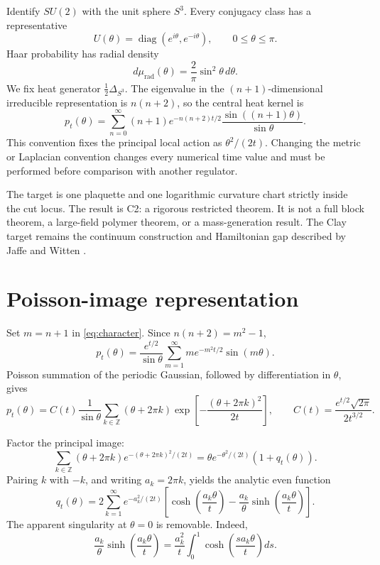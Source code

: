 \documentclass[11pt]{article}
\theoremstyle{definition}
\begin{document}
Identify $SU(2)$ with the unit sphere $S^3$.  Every conjugacy class has a
representative
\[
 U(\theta)=\operatorname{diag}(e^{i\theta},e^{-i\theta}),
 \qquad 0\le\theta\le\pi.
\]
Haar probability has radial density
\begin{equation}\label{eq:haar}
 d\mu_{\mathrm{rad}}(\theta)=\frac{2}{\pi}\sin^2\theta\,d\theta.
\end{equation}
We fix heat generator $\frac12\Delta_{S^3}$.  The eigenvalue in the
$(n+1)$-dimensional irreducible representation is $n(n+2)$, so the central
heat kernel is
\begin{equation}\label{eq:character}
 p_t(\theta)=\sum_{n=0}^{\infty}(n+1)e^{-n(n+2)t/2}
 \frac{\sin((n+1)\theta)}{\sin\theta}.
\end{equation}
This convention fixes the principal local action as $\theta^2/(2t)$.  Changing
the metric or Laplacian convention changes every numerical time value and must
be performed before comparison with another regulator.

The target is one plaquette and one logarithmic curvature chart strictly
inside the cut locus.  The result is C2: a rigorous restricted theorem.  It is
not a full block theorem, a large-field polymer theorem, or a mass-generation
result.  The Clay target remains the continuum construction and Hamiltonian
gap described by Jaffe and Witten \cite{JaffeWitten}.

\section{Poisson-image representation}

Set $m=n+1$ in \eqref{eq:character}.  Since $n(n+2)=m^2-1$,
\[
 p_t(\theta)=\frac{e^{t/2}}{\sin\theta}
 \sum_{m=1}^{\infty}m e^{-m^2t/2}\sin(m\theta).
\]
Poisson summation of the periodic Gaussian, followed by differentiation in
$\theta$, gives
\begin{equation}\label{eq:image}
 p_t(\theta)=C(t)\frac{1}{\sin\theta}
 \sum_{k\in\mathbb Z}(\theta+2\pi k)
 \exp\left[-\frac{(\theta+2\pi k)^2}{2t}\right],
 \qquad
 C(t)=\frac{e^{t/2}\sqrt{2\pi}}{2t^{3/2}}.
\end{equation}

Factor the principal image:
\begin{equation}\label{eq:q-def}
 \sum_{k\in\mathbb Z}(\theta+2\pi k)e^{-(\theta+2\pi k)^2/(2t)}
 =\theta e^{-\theta^2/(2t)}(1+q_t(\theta)).
\end{equation}
Pairing $k$ with $-k$, and writing $a_k=2\pi k$, yields the analytic even
function
\begin{equation}\label{eq:q-pair}
 q_t(\theta)=2\sum_{k=1}^{\infty}e^{-a_k^2/(2t)}
 \left[
 \cosh\left(\frac{a_k\theta}{t}\right)
 -\frac{a_k}{\theta}\sinh\left(\frac{a_k\theta}{t}\right)
 \right].
\end{equation}
The apparent singularity at $\theta=0$ is removable.  Indeed,
\begin{equation}\label{eq:sinh-integral}
 \frac{a_k}{\theta}\sinh\left(\frac{a_k\theta}{t}\right)
 =\frac{a_k^2}{t}\int_0^1
 \cosh\left(\frac{s a_k\theta}{t}\right)ds.
\end{equation}
\end{document}
